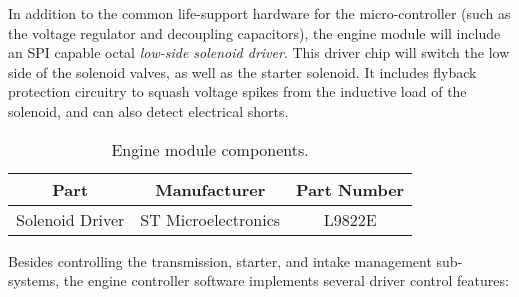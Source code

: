 In addition to the common life-support hardware for the micro-controller (such as the voltage regulator and decoupling capacitors), the engine module will include an SPI capable octal \emph{low-side solenoid driver}. This driver chip will switch the low side of the solenoid valves, as well as the starter solenoid. It includes flyback protection circuitry to squash voltage spikes from the inductive load of the solenoid, and can also detect electrical shorts. 

\begin{table}[H]
	\caption{Engine module components.}
	\label{table:engine_module_components}
	\centering
	\begin{tabular}{|c|c|c|}
		\hline 
		Part & Manufacturer & Part Number\tabularnewline 
		\hline \hline
		Solenoid Driver & ST Microelectronics & L9822E\tabularnewline \hline
		\hline
	\end{tabular}
\end{table}

Besides controlling the transmission, starter, and intake management sub-systems, the engine controller software implements several driver control features:


